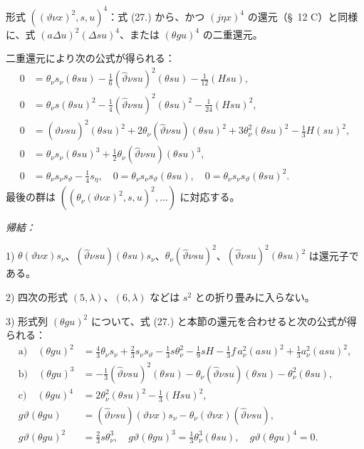 \documentclass[11pt]{jlreq}
\newcommand{\A}{\Delta}
\begin{document}
形式 $((\vartheta\nu x)^2,s,u)^4$：式 (27.) から、かつ $(j\eta x)^4$ の還元（\S\ 12 C）と同様に、式 $(a\A u)^2(\A su)^4$、または $(\theta gu)^4$ の二重還元。

二重還元により次の公式が得られる：
\[
\tag{28}
\begin{aligned}
0&=\theta_\nu s_\nu(\theta su)-\frac16(\widehat\vartheta\nu su)^2(\theta su)-\frac1{12}(Hsu),\\
0&=\theta_\nu s(\theta su)^2-\frac14(\widehat\vartheta\nu su)^2(\theta su)^2-\frac1{24}(Hsu)^2,\\
0&=(\widehat\vartheta\nu su)^2(\theta su)^2+2\theta_\nu(\widehat\vartheta\nu su)(\theta su)^2
  +3\theta_\nu^2(\theta su)^2-\frac13H(su)^2,\\
0&=\theta_\nu s_\nu(\theta su)^3+\frac12\theta_\nu(\widehat\vartheta\nu su)(\theta su)^3,\\
0&=\theta_\nu s_\nu s_\vartheta-\frac14s_\eta,
\quad 0=\theta_\nu s_\nu s_\vartheta(\theta su),
\quad 0=\theta_\nu s_\nu s_\vartheta(\theta su)^2.
\end{aligned}
\]
最後の群は $((\theta_\nu(\vartheta\nu x)^2,s,u)^2,\ldots)$ に対応する。

\noindent\emph{帰結：}

1) $\theta(\vartheta\nu x)s_\nu$、$(\widehat\vartheta\nu su)(\theta su)s_\nu$、$\theta_\nu(\widehat\vartheta\nu su)^2$、$(\widehat\vartheta\nu su)^2(\theta su)^2$ は還元子である。

2) 四次の形式 $(5,\lambda)$、$(6,\lambda)$ などは $s^2$ との折り畳みに入らない。

3) 形式列 $(\theta gu)^2$ について、式 (27.) と本節の還元を合わせると次の公式が得られる：
\[
\tag{29}
\begin{aligned}
\text{a)}\quad (\theta gu)^2&=\frac43\theta_\nu s_\nu+\frac23s_\nu s_\vartheta-\frac13s\theta_\nu^2-\frac19sH-\frac13f\,a_\nu^2(asu)^2+\frac13a_\nu^2(asu)^2,\\
\text{b)}\quad (\theta gu)^3&=-\frac13(\widehat\vartheta\nu su)^2(\theta su)-\theta_\nu(\widehat\vartheta\nu su)(\theta su)-\theta_\nu^2(\theta su),\\
\text{c)}\quad (\theta gu)^4&=2\theta_\nu^2(\theta su)^2-\frac13(Hsu)^2,\\
g\vartheta(\theta gu)&=(\widehat\vartheta\nu su)(\vartheta\nu x)s_\nu-\theta_\nu(\vartheta\nu x)(\widehat\vartheta\nu su),\\
g\vartheta(\theta gu)^2&=\frac23s\theta_\nu^3,
\quad g\vartheta(\theta gu)^3=\frac13\theta_\nu^3(\theta su),
\quad g\vartheta(\theta gu)^4=0.
\end{aligned}
\]
\end{document}

